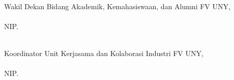 \begin{minipage}{0.35\textwidth}
    \hfill\\[2em]
    Wakil Dekan Bidang Akademik, Kemahasiswaan, dan Alumni FV UNY,\\[2cm]
    \wakildekan \\
    NIP. \NIPwakildekan
\end{minipage}
\hfill
\begin{minipage}{0.47\textwidth}
    \hfill\\[2em]
    Koordinator Unit Kerjasama dan Kolaborasi Industri {\prodi} FV UNY,\\[2cm]
    \koordinatorUKKI \\
    NIP. \NIPkoordinatorUKKI
\end{minipage}%


